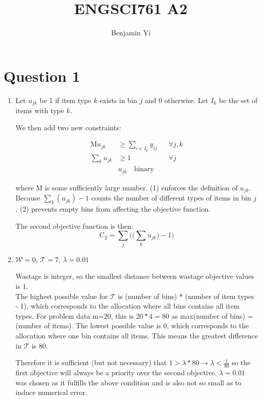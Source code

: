 \documentclass[10pt,a4paper]{article}
\begin{document}
\title{ENGSCI761 A2}
\author{Benjamin Yi}
	
\section*{Question 1}
\begin{enumerate}
\item
Let \(u_{jk}\) be 1 if item type \(k\) exists in bin \(j\) and 0 otherwise. Let \(I_k\) be the set of items with type \(k\).

We then add two new constraints:

\begin{align}
	\text{M}u_{jk} &\geq \sum_{i \in I_k} y_{ij} &&\forall j, k \\
	\sum_k u_{jk} & \geq 1 &&\forall j \\
	&u_{jk} \quad \text{binary}
\end{align}

where M is some sufficiently large number. (1) enforces the definition of \(u_{jk}\). Because \(\sum_k(u_{jk}) - 1\) counts the number of different types of items in bin \(j\), (2) prevents empty bins from affecting the objective function.

The second objective function is then:
\begin{equation*}
	\text{C}_2 = \sum_j \bigg(\bigg(\sum_k u_{jk}\bigg)-1\bigg)
\end{equation*}

\item 
\(\mathcal{W} = 0\), \(\mathcal{T} = 7\), \(\lambda = 0.01\)

Wastage is integer, so the smallest distance between wastage objective values is 1.\\
The highest possible value for \(\mathcal{T}\) is (number of bins) * (number of item types - 1), which corresponds to the allocation where all bins contains all item types. For problem data m=20, this is \(20 * 4 = 80\) as max(number of bins) = (number of items). The lowest possible value is 0, which corresponds to the allocation where one bin contains all items. This means the greatest difference in \(\mathcal{T}\) is 80.

Therefore it is sufficient (but not necessary) that \(1 > \lambda * 80 \rightarrow \lambda < \frac{1}{80}\) so the first objective will always be a priority over the second objective. \(\lambda = 0.01\) was chosen as it fulfills the above condition and is also not so small as to induce numerical error.


\end{enumerate}
\end{document}
